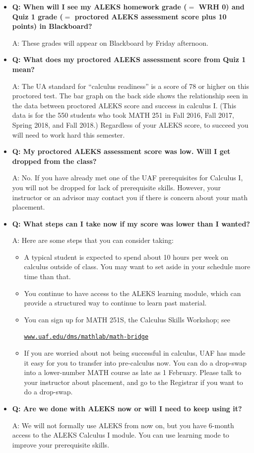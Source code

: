\documentclass[12pt]{article}
\begin{document}
\begin{itemize}
\item \textbf{Q: When will I see my ALEKS homework grade ($=$ WRH 0) and Quiz 1 grade ($=$ proctored ALEKS assessment score plus 10 points) in Blackboard?}

A: These grades will appear on Blackboard by Friday afternoon.

\item \textbf{Q: What does my proctored ALEKS assessment score from Quiz 1 mean?}

A: The UA standard for ``calculus readiness'' is a score of 78 or higher on this proctored test.  The bar graph on the back side shows the relationship seen in the data between proctored ALEKS score and success in calculus I.  (This data is for the 550 students who took MATH 251 in Fall 2016, Fall 2017, Spring 2018, and Fall 2018.)  Regardless of your ALEKS score, to succeed you will need to work hard this semester.

\item \textbf{Q: My proctored ALEKS assessment score was low.  Will I get dropped from the class?}

A:  No. If you have already met one of the UAF prerequisites for Calculus I, you will not be
dropped for lack of prerequisite skills.  However, your instructor or an advisor may contact you if there is concern about your math placement.

\item \textbf{Q: What steps can I take now if my score was lower than I wanted?}

A: Here are some steps that you can consider taking:
    \begin{itemize}
    \item A typical student is expected to spend about 10 hours per week on calculus outside of class.  You may want to set aside in your schedule more time than that.
    \item You continue to have access to the ALEKS learning module, which can provide a structured way to continue to learn past material.
    \item You can sign up for MATH 251S, the Calculus Skills Workshop; see

\centerline{\href{https://www.uaf.edu/dms/mathlab/math-bridge/}{\texttt{www.uaf.edu/dms/mathlab/math-bridge}}}
    \item If you are worried about not being successful in calculus, UAF has made it easy for you to transfer into pre-calculus now.  You can do a drop-swap into a lower-number MATH course as late as 1 February.  Please talk to your instructor about placement, and go to the Registrar if you want to do a drop-swap.
    \end{itemize}

\item \textbf{Q: Are we done with ALEKS now or will I need to keep using it?}

A: We will not formally use ALEKS from now on, but you have 6-month access to the ALEKS Calculus I module.  You can use learning mode to improve your prerequisite skills.
\end{itemize}
\end{document}
